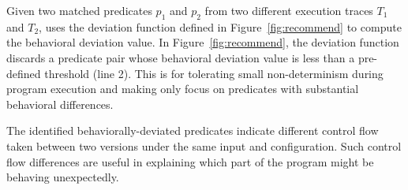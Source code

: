 Given two matched predicates $p_{1}$ and $p_{2}$ from two different execution traces $T_{1}$ and $T_{2}$,
\ourtool uses the {deviation} function defined in Figure~\ref{fig:recommend}
to compute the behavioral deviation value.
In Figure~\ref{fig:recommend}, the {deviation} function
 discards a predicate pair whose behavioral deviation value is less than
a pre-defined threshold (line 2). This is for tolerating small non-determinism
during program execution and
making \ourtool only focus on predicates with substantial
behavioral differences.

The identified behaviorally-deviated predicates indicate different
control flow taken between two versions under the same input
and configuration. Such control flow differences are useful
in explaining %
which part of the program might be behaving unexpectedly. 





